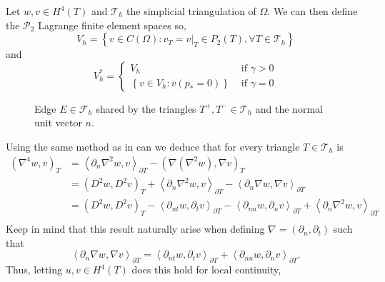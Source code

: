 Let $w,v \in  H^{4} \left( T  \right) $ and $\mathcal{T}_{h} $ the simplicial triangulation of $\Omega$. We can then
define the $\mathcal{P}_{2} $ Lagrange finite element spaces so,
\[
V_{h} = \left\{ v \in C\left( \Omega  \right): v_{T} = v | _{T} \in P_{2}\left( T \right), \forall T \in
\mathcal{T}_{h}    \right\}
\]
and
\[
V_{h}^{*} = \begin{cases}
    V_{h} & \text{ if } \gamma > 0 \\
    \left\{ v \in V_{h}: v\left( p_{*} = 0 \right)    \right\} &  \text{ if } \gamma  = 0
\end{cases}
\]
\begin{figure}[!h]
\centering
{}
\caption{Edge $E \in \mathcal{F}_h $ shared by the triangles $T^{+}, T^{-} \in \mathcal{T}_{h} $ and the normal unit vector $n$.  }
    \label{fig:normal}
\end{figure}


Using the same method as in \cite{gu2012c0, brenner2012quadratic} can we
deduce that for every triangle $T \in  \mathcal{T}_{h} $ is \[
    \begin{split}
        \left( \nabla ^{4} w, v \right) _{T} &= \left< \partial _{n} \nabla ^2 w, v \right>_{\partial T} - \left( \nabla \left( \nabla ^2 w
 \right), \nabla  v  \right)_{T}   \\
 &= \left( D^2w, D^2v \right)_{T} + \left< \partial _{n} \nabla ^2 w, v \right>_{\partial T}  - \left<\partial _{n}
 \nabla w, \nabla v \right>_{\partial T} \\
 &=  \left( D^2 w, D^2 v \right)_{T} - \left<\partial _{nt} w, \partial _{t} v \right>_{\partial T} - \left<\partial
 _{nn} w, \partial _{n} v \right> _{\partial T} +  \left<\partial _{n} \nabla ^2 w, v \right>_{\partial T} \\
    \end{split}
\]
Keep in mind that this result naturally arise when defining $\nabla  = \left( \partial _{n}, \partial _{t} \right) $ such that
\[
\left<\partial _{n} \nabla w, \nabla v \right>_{\partial T} = \left<\partial _{nt} w, \partial _{t} v\right> _{\partial
T} + \left< \partial _{nn} w, \partial _{n} v  \right> _{\partial T} .
\]
 Thus, letting $u,v \in
H^{4}\left( T  \right) $  does this hold for local continuity,

